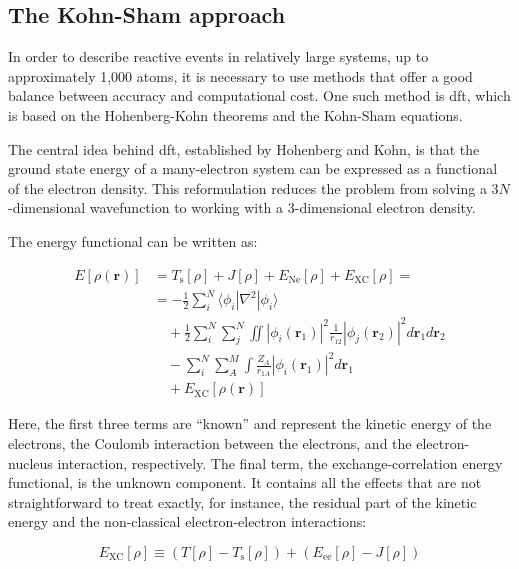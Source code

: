 \subsection{The Kohn-Sham approach}
In order to describe reactive events in relatively large systems, up to approximately 1,000 atoms, it is necessary to use methods that offer a good balance between accuracy and computational cost. One such method is \ac{dft}, which is based on the Hohenberg-Kohn theorems and the Kohn-Sham equations.

The central idea behind \ac{dft}, established by Hohenberg and Kohn, is that the ground state energy of a many-electron system can be expressed as a functional of the electron density. This reformulation reduces the problem from solving a 3$N$-dimensional wavefunction to working with a 3-dimensional electron density.

The energy functional can be written as:

\begin{equation}
    \begin{aligned}
    E[\rho(\mathbf{r})] &= T_{\text{s}}[\rho] + J[\rho] + E_{\text{Ne}}[\rho] + E_{\text{XC}}[\rho] =  \\
    &= -\frac{1}{2} \sum_{i}^{N} \langle \phi_i | \nabla^2 | \phi_i \rangle \\
    &\quad + \frac{1}{2} \sum_{i}^{N} \sum_{j}^{N} \iint \left| \phi_i(\mathbf{r}_1) \right|^2 \frac{1}{r_{12}} \left| \phi_j(\mathbf{r}_2) \right|^2 d\mathbf{r}_1 d\mathbf{r}_2 \\
    &\quad - \sum_{i}^{N} \sum_{A}^{M} \int \frac{Z_A}{r_{1A}} \left| \phi_i(\mathbf{r}_1) \right|^2 d\mathbf{r}_1 \\
    &\quad + E_{\text{XC}}[\rho(\mathbf{r})] 
    \label{eq:ks_energy}
    \end{aligned}
\end{equation}

Here, the first three terms are “known” and represent the kinetic energy of the electrons, the Coulomb interaction between the electrons, and the electron-nucleus interaction, respectively. The final term, the exchange-correlation energy functional, is the unknown component. It contains all the effects that are not straightforward to treat exactly, for instance, the residual part of the kinetic energy and the non-classical electron-electron interactions:

\begin{equation}
    E_{\text{XC}}[\rho] \equiv (T[\rho] - T_{\text{s}}[\rho]) + (E_{\text{ee}}[\rho] - J[\rho])
    \label{eq:xc_energy}
\end{equation}

